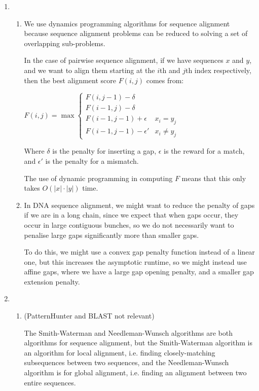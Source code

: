 


\begin{enumerate}[label=(\alph*)]
  \item
    \begin{enumerate}[label=(\roman*)]
      \item

        We use dynamics programming algorithms for sequence alignment because sequence alignment problems can be reduced to solving a set of overlapping sub-problems.

        In the case of pairwise sequence alignment, if we have sequences $x$ and $y$, and we want to align them starting at the $i$th and $j$th index respectively, then the best alignment score $F(i,j)$ comes from:

        $F(i,j) = \max \begin{cases}F(i, j-1) - \delta\\F(i-1, j) - \delta\\F(i-1, j-1) + \epsilon & x_i=y_j\\F(i-1, j-1) - \epsilon' & x_i\neq y_j\end{cases}$

        Where $\delta$ is the penalty for inserting a gap, $\epsilon$ is the reward for a match, and $\epsilon'$ is the penalty for a mismatch.

        The use of dynamic programming in computing $F$ means that this only takes $O(|x| \cdot |y|)$ time.

      \item
        In DNA sequence alignment, we might want to reduce the penalty of gaps if we are in a long chain, since we expect that when gaps occur, they occur in large contiguous bunches, so we do not necessarily want to penalise large gaps significantly more than smaller gaps.

        To do this, we might use a convex gap penalty function instead of a linear one, but this increases the asymptotic runtime, so we might instead use affine gaps, where we have a large gap opening penalty, and a smaller gap extension penalty.

        
    \end{enumerate}

  \item
    \begin{enumerate}[label=(\roman*)]
      \item
        (PatternHunter and BLAST not relevant)

        The Smith-Waterman and Needleman-Wunsch algorithms are both algorithms for sequence alignment, but the Smith-Waterman algorithm is an algorithm for local alignment, i.e. finding closely-matching subsequences between two sequences, and the Needleman-Wunsch algorithm is for global alignment, i.e. finding an alignment between two entire sequences.


\end{enumerate}
\end{enumerate}

